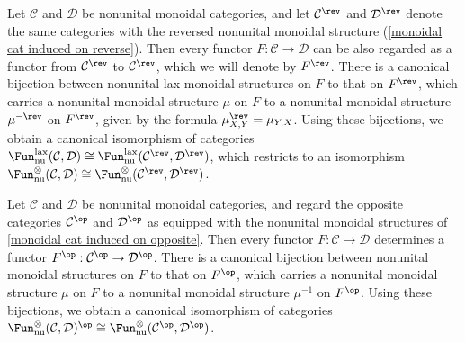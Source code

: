 \begin{example}\label{monoidal cat nonunital lax functor on reverse char}
Let $\mathcal{C}$ and $\mathcal{D}$ be nonunital monoidal categories, and let $\mathcal{C}^{\rev}$ and $\mathcal{D}^{\rev}$ denote the same categories with the reversed nonunital monoidal structure (\cref{monoidal cat induced on reverse}). Then every functor $F:\mathcal{C}\to\mathcal{D}$ can be also regarded as a functor from $\mathcal{C}^{\rev}$ to $\mathcal{C}^{\rev}$, which we will denote by $F^{\rev}$. There is a canonical bijection between nonunital lax monoidal structures on $F$ to that on $F^{\rev}$, which carries a nonunital monoidal structure $\mu$ on $F$ to a nonunital monoidal structure $\mu^{-\rev}$ on $F^{\rev}$, given by the formula $\mu^{\rev}_{X,Y}=\mu_{Y,X}$. Using these bijections, we obtain a canonical isomorphism of categories $\Fun^{\mathrm{lax}}_{\mathrm{nu}}(\mathcal{C},\mathcal{D})\cong\Fun_{\mathrm{nu}}^{\mathrm{lax}}(\mathcal{C}^{\rev},\mathcal{D}^{\rev})$, which restricts to an isomorphism $\Fun^{\otimes}_{\mathrm{nu}}(\mathcal{C},\mathcal{D})\cong\Fun_{\mathrm{nu}}^{\otimes}(\mathcal{C}^{\rev},\mathcal{D}^{\rev})$.
\end{example}
\begin{example}\label{monoidal cat nonunital monoidal functor on opposite char}
Let $\mathcal{C}$ and $\mathcal{D}$ be nonunital monoidal categories, and regard the opposite categories $\mathcal{C}^{\op}$ and $\mathcal{D}^{\op}$ as equipped with the nonunital monoidal structures of \cref{monoidal cat induced on opposite}. Then every functor $F:\mathcal{C}\to\mathcal{D}$ determines a functor $F^{\op}:\mathcal{C}^{\op}\to\mathcal{D}^{\op}$. There is a canonical bijection between nonunital monoidal structures on $F$ to that on $F^{\op}$, which carries a nonunital monoidal structure $\mu$ on $F$ to a nonunital monoidal structure $\mu^{-1}$ on $F^{\op}$. Using these bijections, we obtain a canonical isomorphism of categories $\Fun_{\mathrm{nu}}^{\otimes}(\mathcal{C},\mathcal{D})^{\op}\cong\Fun_{\mathrm{nu}}^{\otimes}(\mathcal{C}^{\op},\mathcal{D}^{\op})$.
\end{example}
